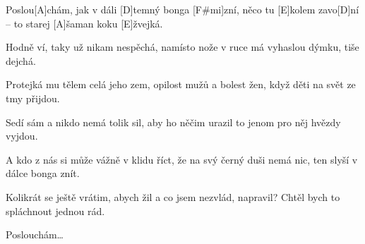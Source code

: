 
\sloka
Poslou[A]chám, jak v dáli [D]temný bonga [F#mi]zní,
něco tu [E]kolem zavo[D]ní –
to starej [A]šaman koku [E]žvejká.

\sloka
Hodně ví, taky už nikam nespěchá,
namísto nože v ruce má
vyhaslou dýmku, tiše dejchá.

\sloka
Protejká mu tělem celá jeho zem,
opilost mužů a bolest žen,
když děti na svět ze tmy přijdou.

\sloka
Sedí sám a nikdo nemá tolik sil,
aby ho něčim urazil
to jenom pro něj hvězdy vyjdou.

\sloka
A kdo z nás si může vážně v klidu říct,
že na svý černý duši nemá nic,
ten slyší v dálce bonga znít.

\sloka
Kolikrát se ještě vrátim, abych žil
a co jsem nezvlád, napravil?
Chtěl bych to spláchnout jednou rád.

\sloka
Poslouchám…

